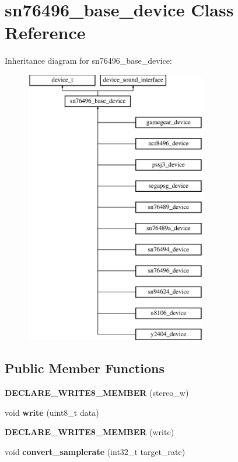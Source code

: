 \hypertarget{classsn76496__base__device}{\section{sn76496\-\_\-base\-\_\-device Class Reference}
\label{classsn76496__base__device}
}
Inheritance diagram for sn76496\-\_\-base\-\_\-device\-:\begin{figure}[H]
\begin{center}
\leavevmode
\includegraphics[height=12.000000cm]{classsn76496__base__device}
\end{center}
\end{figure}
\subsection*{Public Member Functions}
\begin{DoxyCompactItemize}
\item 
\hypertarget{classsn76496__base__device_a9995cec5d0bbba38a61ee8ea2052c6ca}{{\bfseries D\-E\-C\-L\-A\-R\-E\-\_\-\-W\-R\-I\-T\-E8\-\_\-\-M\-E\-M\-B\-E\-R} (stereo\-\_\-w)}\label{classsn76496__base__device_a9995cec5d0bbba38a61ee8ea2052c6ca}

\item 
\hypertarget{classsn76496__base__device_a985ce1f5b9f10c590a77c4a780ee4a56}{void {\bfseries write} (uint8\-\_\-t data)}\label{classsn76496__base__device_a985ce1f5b9f10c590a77c4a780ee4a56}

\item 
\hypertarget{classsn76496__base__device_a07176d7f7d97414f4ade5961fc510274}{{\bfseries D\-E\-C\-L\-A\-R\-E\-\_\-\-W\-R\-I\-T\-E8\-\_\-\-M\-E\-M\-B\-E\-R} (write)}\label{classsn76496__base__device_a07176d7f7d97414f4ade5961fc510274}

\item 
\hypertarget{classsn76496__base__device_ab023c6361d344a21bb4bd7e0bd9616e8}{void {\bfseries convert\-\_\-samplerate} (int32\-\_\-t target\-\_\-rate)}\label{classsn76496__base__device_ab023c6361d344a21bb4bd7e0bd9616e8}

\end{DoxyCompactItemize}
